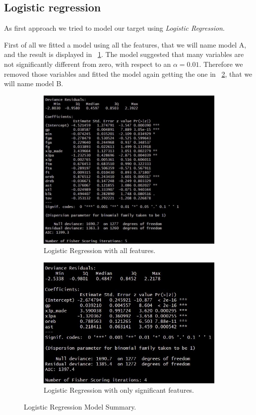 \subsection{Logistic regression}
As first approach we tried to model our target using \textit{Logistic Regression}.

First of all we fitted a model using all the features, that we will name model A, and the result is displayed in \Fig~\ref{fig:LRAllSum}. The model suggested that many variables are not significantly different from zero, with respect to an $\alpha = 0.01$. Therefore we removed those variables and fitted the model again getting the one in \Fig~\ref{fig:LRImpSum}, that we will name model B.

\begin{figure}[h]
	\begin{subfigure}{.6\textwidth}
		\centering
		\includegraphics[width=0.7\linewidth]{ImageFiles/Classification/LogReg/log_reg_all_summary}
		\caption{Logistic Regression with all features.}
		\label{fig:LRAllSum}
	\end{subfigure}
	\begin{subfigure}{.6\textwidth}
		\centering
		\includegraphics[width=0.8\linewidth]{ImageFiles/Classification/LogReg/log_reg_imp_summary}
		\caption{Logistic Regression with only significant features.}
		\label{fig:LRImpSum}
	\end{subfigure}
	\caption{Logistic Regression Model Summary.}
	\label{fig:LRSum}
\end{figure}

